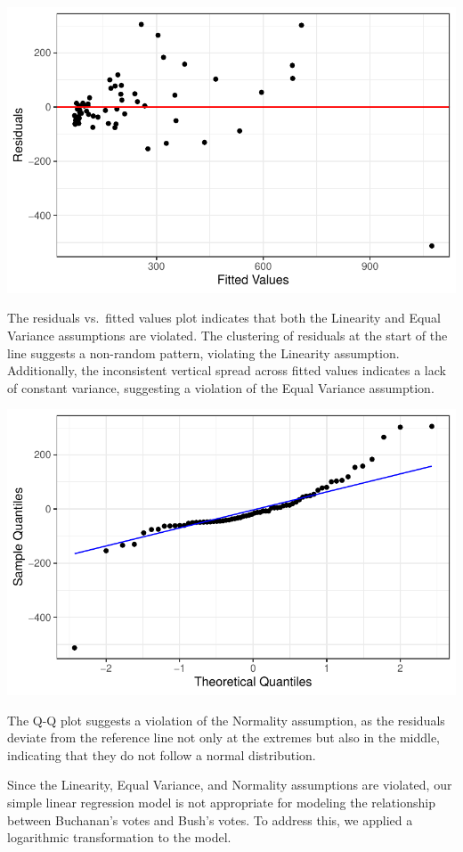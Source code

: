\documentclass[
  letterpaper,
  DIV=11,
  numbers=noendperiod]{scrartcl}
\begin{document}
\includegraphics{SDS-291-case-study-1_files/figure-pdf/unnamed-chunk-5-1.pdf}

The residuals vs.~fitted values plot indicates that both the Linearity
and Equal Variance assumptions are violated. The clustering of residuals
at the start of the line suggests a non-random pattern, violating the
Linearity assumption. Additionally, the inconsistent vertical spread
across fitted values indicates a lack of constant variance, suggesting a
violation of the Equal Variance assumption.

\includegraphics{SDS-291-case-study-1_files/figure-pdf/unnamed-chunk-6-1.pdf}

The Q-Q plot suggests a violation of the Normality assumption, as the
residuals deviate from the reference line not only at the extremes but
also in the middle, indicating that they do not follow a normal
distribution.

Since the Linearity, Equal Variance, and Normality assumptions are
violated, our simple linear regression model is not appropriate for
modeling the relationship between Buchanan's votes and Bush's votes. To
address this, we applied a logarithmic transformation to the model.
\end{document}
